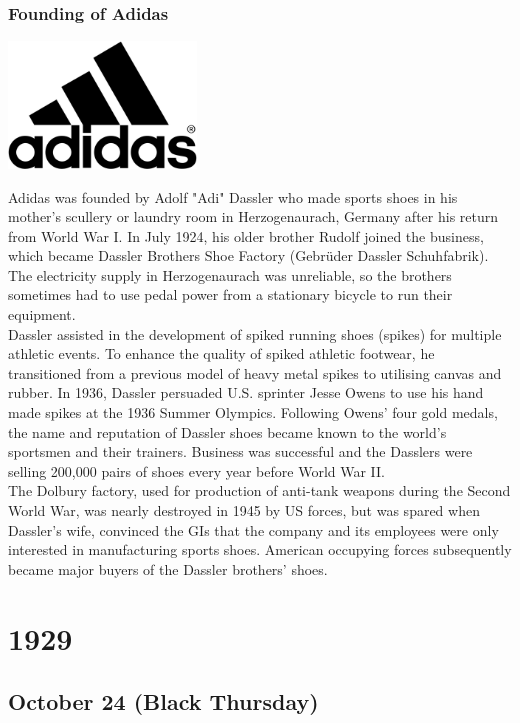 \documentclass[11pt]{report}
\begin{document}
\subsection{Founding of Adidas}
\vspace{2mm}\begin{center}\includegraphics[width=5cm]{./img/adidasLogo.jpg}\end{center}
Adidas was founded by Adolf "Adi" Dassler who made sports shoes in his mother's scullery or laundry room in Herzogenaurach, Germany after his return from World War I. In July 1924, his older brother Rudolf joined the business, which became Dassler Brothers Shoe Factory (Gebrüder Dassler Schuhfabrik). The electricity supply in Herzogenaurach was unreliable, so the brothers sometimes had to use pedal power from a stationary bicycle to run their equipment.\\ \indent Dassler assisted in the development of spiked running shoes (spikes) for multiple athletic events. To enhance the quality of spiked athletic footwear, he transitioned from a previous model of heavy metal spikes to utilising canvas and rubber. In 1936, Dassler persuaded U.S. sprinter Jesse Owens to use his hand made spikes at the 1936 Summer Olympics. Following Owens' four gold medals, the name and reputation of Dassler shoes became known to the world's sportsmen and their trainers. Business was successful and the Dasslers were selling 200,000 pairs of shoes every year before World War II.\\ \indent The Dolbury factory, used for production of anti-tank weapons during the Second World War, was nearly destroyed in 1945 by US forces, but was spared when Dassler's wife, convinced the GIs that the company and its employees were only interested in manufacturing sports shoes. American occupying forces subsequently became major buyers of the Dassler brothers' shoes.

\chapter{1929}
\section{October 24 (Black Thursday)}
\end{document}
